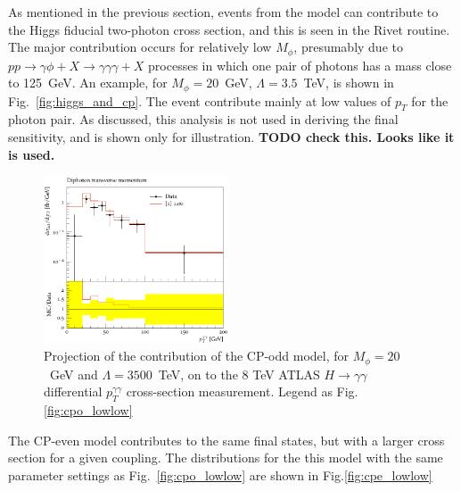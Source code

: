 \documentclass[11pt]{cernrep}
\begin{document}
As mentioned in the previous section, events from the model can contribute to the Higgs fiducial two-photon cross section,
and this is seen in the Rivet routine. The major contribution occurs for relatively low $M_\phi$, presumably due to 
$pp \rightarrow \gamma \phi + X \rightarrow \gamma \gamma \gamma + X$ processes in which one pair 
of photons has a mass close to 125~GeV. An example, for $M_\phi = 20$~GeV, $\Lambda = 3.5$~TeV, is shown in Fig.~\ref{fig:higgs_and_cp}.
The event contribute mainly at low values of $p_T$ for the photon pair. As discussed, this analysis is not used in deriving
the final sensitivity, and is shown only for illustration. {\bf TODO check this. Looks like it is used.}

\begin{figure}
\begin{center}
\includegraphics[width=0.49\textwidth]{ATLAS_2014_I1306615_d01-x01-y01-20_3500.pdf}
    \caption{Projection of the contribution of the CP-odd model, for $M_{\phi} = 20$~GeV and $\Lambda = 3500$~TeV, on to the 
8 TeV ATLAS $H \rightarrow \gamma\gamma$ differential $p_T^{\gamma\gamma}$ cross-section measurement.
Legend as Fig.\protect\ref{fig:cpo_lowlow}}
\label{fig:higgs_and_cpo}
\end{center}
\end{figure}

The CP-even model contributes to the same final states, but with a larger cross section for a given coupling. The distributions
for the this model with the same parameter settings as Fig.~\ref{fig:cpo_lowlow} are shown in Fig.\ref{fig:cpe_lowlow}
\end{document}
